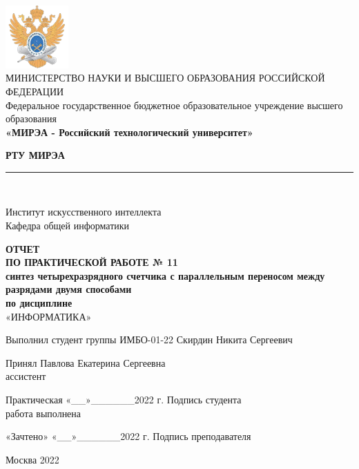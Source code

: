 \documentclass[14pt, a4paper]{extreport}
\newcommand{\doublerule}[1][.4pt]{%
	\noindent
	\makebox[0pt][l]{\rule[.6ex]{\linewidth}{#1}}%
	\rule[.3ex]{\linewidth}{#1}
}
\begin{document}
\begin{titlepage}
	\begin{center}
		\vspace*{0.5mm}

		\includegraphics[width=0.18\textwidth]{logo}\\
		\footnotesize
		МИНИСТЕРСТВО НАУКИ И ВЫСШЕГО ОБРАЗОВАНИЯ РОССИЙСКОЙ ФЕДЕРАЦИИ\\
		\small
		Федеральное государственное бюджетное образовательное учреждение высшего образования\\
		\textbf{«МИРЭА - Российский технологический университет»}
		\vspace{0.5cm}

		\large \textbf{РТУ МИРЭА} \normalsize

		\doublerule[1pt]\\
		\vspace{0.4cm}

		Институт искусственного интеллекта\\
		Кафедра общей информатики
		\vspace{1.5cm}

		\textbf{ОТЧЕТ}\\
		\textbf{ПО ПРАКТИЧЕСКОЙ РАБОТЕ № 11}\\
		\textbf{синтез четырехразрядного счетчика с параллельным переносом между разрядами двумя способами}\\
		\textbf{по дисциплине}\\
		«ИНФОРМАТИКА»
		\vspace{1.5cm}

		\small
		Выполнил студент группы ИМБО-01-22 \hfill Скирдин Никита Сергеевич
		\vspace{1cm}

		Принял \hfill Павлова Екатерина Сергеевна\\
		ассистент \hfill
		\vspace{1.5cm}

		\footnotesize
		\hspace{0.5cm} Практическая \hfill «\_\_»\_\_\_\_\_\_2022 г. \hfill Подпись студента\\
		\hspace{0.5cm} работа выполнена \hfill
		\vspace{0.5cm}

		\hspace{2cm} «Зачтено» \hfill «\_\_»\_\_\_\_\_\_2022 г. \hfill Подпись преподавателя
		\vfill

		\small
		Москва 2022
	\end{center}
	\thispagestyle{empty}
\end{titlepage}
\end{document}
